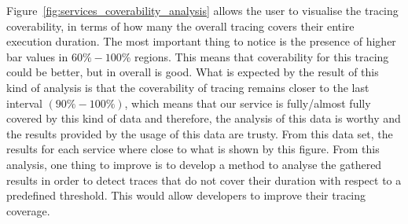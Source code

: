 Figure~\ref{fig:services_coverability_analysis} allows the user to visualise the tracing coverability, in terms of how many the overall tracing covers their entire execution duration. The most important thing to notice is the presence of higher bar values in $60\%-100\%$ regions. This means that coverability for this tracing could be better, but in overall is good. What is expected by the result of this kind of analysis is that the coverability of tracing remains closer to the last interval $(90\%-100\%)$, which means that our service is fully/almost fully covered by this kind of data and therefore, the analysis of this data is worthy and the results provided by the usage of this data are trusty. From this data set, the results for each service where close to what is shown by this figure. From this analysis, one thing to improve is to develop a method to analyse the gathered results in order to detect traces that do not cover their duration with respect to a predefined threshold. This would allow developers to improve their tracing coverage.

\checkoddpage
{}
{ %
\newpage
\blankpage}
{ %
}